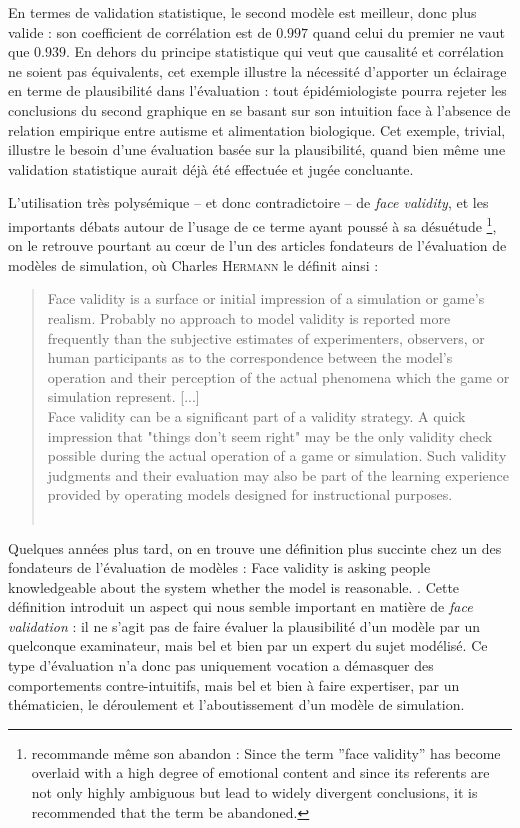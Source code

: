 En termes de validation statistique, le second modèle est meilleur, donc plus valide : son coefficient de corrélation est de $0.997$ quand celui du premier ne vaut que $0.939$.
En dehors du principe statistique qui veut que causalité et corrélation ne soient pas équivalents, cet exemple illustre la nécessité d'apporter un éclairage en terme de plausibilité dans l'évaluation :
	tout épidémiologiste pourra rejeter les conclusions du second graphique en se basant sur son intuition face à l'absence de relation empirique entre autisme et alimentation biologique.
Cet exemple, trivial, illustre le besoin d'une évaluation basée sur la plausibilité, quand bien même une validation statistique aurait déjà été effectuée et jugée concluante.


L'utilisation très polysémique -- et donc contradictoire -- de \og \textit{face validity}\fg{}, et les importants débats autour de l'usage de ce terme ayant poussé à sa désuétude
\footnote{
	\cite[205]{mosier_critical_1947} recommande même son abandon : \og Since the term ''face validity'' has become overlaid with a high degree of emotional content and since its referents are not only highly ambiguous but lead to widely divergent conclusions, it is recommended that the term be abandoned.\fg{}
}, on le retrouve pourtant au cœur de l'un des articles fondateurs de l'évaluation de modèles de simulation, où Charles H\textsc{ermann} le définit ainsi :

\begin{quotation}
	\og Face validity is a surface or initial impression of a simulation or game's realism.
	Probably no approach to model validity is reported more frequently than the subjective estimates of experimenters, observers, or human participants as to the correspondence between the model's operation and their perception of the actual phenomena which the game or simulation represent.
	[...]\\
	Face validity can be a significant part of a validity strategy. A quick impression that "things don't seem right" may be the only validity check possible during the actual operation of a game or simulation. Such validity judgments and their evaluation may also be part of the learning experience provided by operating models designed for instructional purposes.\fg{}\\
	\mbox{}~ \hfill \cite[221]{hermann_validation_1967}
\end{quotation}

Quelques années plus tard, on en trouve une définition plus succinte chez un des fondateurs de l'évaluation de modèles : \og Face validity is asking people knowledgeable about the system whether the model is reasonable.\fg{} \autocite[500]{sargent_validation_1979}.
Cette définition introduit un aspect qui nous semble important en matière de \textit{face validation} : il ne s'agit pas de faire évaluer la plausibilité d'un modèle par un quelconque examinateur, mais bel et bien par un expert du sujet modélisé.
Ce type d'évaluation n'a donc pas uniquement vocation a démasquer des comportements contre-intuitifs, mais bel et bien à faire expertiser, par un thématicien, le déroulement et l'aboutissement d'un modèle de simulation.

